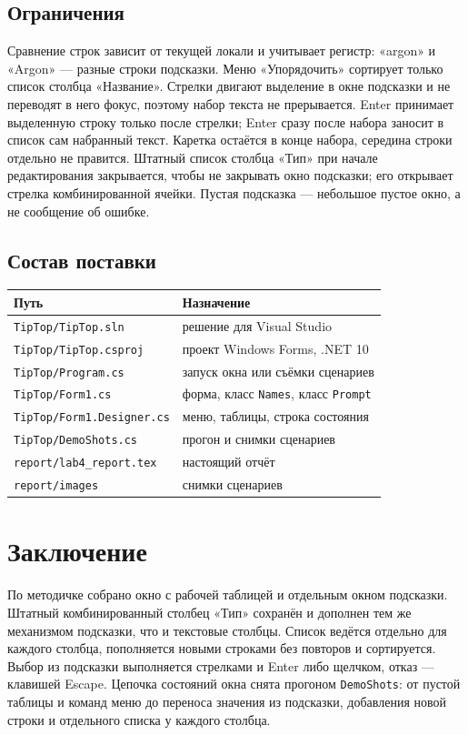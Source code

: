 \documentclass[a4paper,14pt]{extarticle}
\begin{document}
\subsection{Ограничения}
Сравнение строк зависит от текущей локали и учитывает регистр: «argon» и «Argon» --- разные строки подсказки. Меню «Упорядочить» сортирует только список столбца «Название». Стрелки двигают выделение в окне подсказки и не переводят в него фокус, поэтому набор текста не прерывается. Enter принимает выделенную строку только после стрелки; Enter сразу после набора заносит в список сам набранный текст. Каретка остаётся в конце набора, середина строки отдельно не правится. Штатный список столбца «Тип» при начале редактирования закрывается, чтобы не закрывать окно подсказки; его открывает стрелка комбинированной ячейки. Пустая подсказка --- небольшое пустое окно, а не сообщение об ошибке.
\subsection{Состав поставки}
\begin{center}
\begin{tabular}{p{}p{}}
\toprule
Путь & Назначение\\
\midrule
\texttt{TipTop/TipTop.sln} & решение для Visual Studio\\
\texttt{TipTop/TipTop.csproj} & проект Windows Forms, .NET 10\\
\texttt{TipTop/Program.cs} & запуск окна или съёмки сценариев\\
\texttt{TipTop/Form1.cs} & форма, класс \texttt{Names}, класс \texttt{Prompt}\\
\texttt{TipTop/Form1.Designer.cs} & меню, таблицы, строка состояния\\
\texttt{TipTop/DemoShots.cs} & прогон и снимки сценариев\\
\texttt{report/lab4\_report.tex} & настоящий отчёт\\
\texttt{report/images} & снимки сценариев\\
\bottomrule
\end{tabular}
\end{center}
\section*{Заключение}
По методичке собрано окно с рабочей таблицей и отдельным окном подсказки. Штатный комбинированный столбец «Тип» сохранён и дополнен тем же механизмом подсказки, что и текстовые столбцы. Список ведётся отдельно для каждого столбца, пополняется новыми строками без повторов и сортируется. Выбор из подсказки выполняется стрелками и Enter либо щелчком, отказ --- клавишей Escape. Цепочка состояний окна снята прогоном \texttt{DemoShots}: от пустой таблицы и команд меню до переноса значения из подсказки, добавления новой строки и отдельного списка у каждого столбца.
\end{document}

